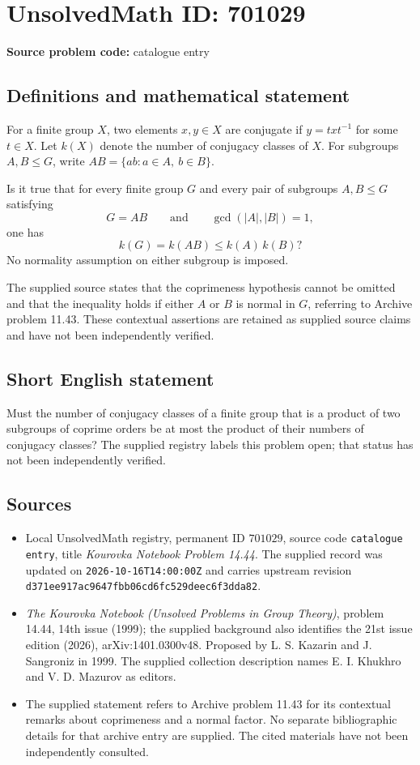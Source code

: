 \documentclass[11pt]{article}
\begin{document}
\section*{UnsolvedMath ID: 701029}
\textbf{Source problem code:} catalogue entry
\subsection{Definitions and mathematical statement}
For a finite group \(X\), two elements \(x,y\in X\) are conjugate if \(y=txt^{-1}\) for some \(t\in X\). Let \(k(X)\) denote the number of conjugacy classes of \(X\). For subgroups \(A,B\leq G\), write \(AB=\{ab:a\in A,\ b\in B\}\).

Is it true that for every finite group \(G\) and every pair of subgroups \(A,B\leq G\) satisfying
\[
G=AB\qquad\text{and}\qquad \gcd(|A|,|B|)=1,
\]
one has
\[
k(G)=k(AB)\leq k(A)\,k(B)?
\]
No normality assumption on either subgroup is imposed.

The supplied source states that the coprimeness hypothesis cannot be omitted and that the inequality holds if either \(A\) or \(B\) is normal in \(G\), referring to Archive problem 11.43. These contextual assertions are retained as supplied source claims and have not been independently verified.
\subsection{Short English statement}
Must the number of conjugacy classes of a finite group that is a product of two subgroups of coprime orders be at most the product of their numbers of conjugacy classes? The supplied registry labels this problem open; that status has not been independently verified.
\subsection{Sources}
\begin{itemize}
\item Local UnsolvedMath registry, permanent ID \(701029\), source code \texttt{catalogue entry}, title \emph{Kourovka Notebook Problem 14.44}. The supplied record was updated on \texttt{2026-10-16T14:00:00Z} and carries upstream revision \texttt{d371ee917ac9647fbb06cd6fc529deec6f3dda82}.
\item \emph{The Kourovka Notebook (Unsolved Problems in Group Theory)}, problem 14.44, 14th issue (1999); the supplied background also identifies the 21st issue edition (2026), arXiv:1401.0300v48. Proposed by L. S. Kazarin and J. Sangroniz in 1999. The supplied collection description names E. I. Khukhro and V. D. Mazurov as editors.
\item The supplied statement refers to Archive problem 11.43 for its contextual remarks about coprimeness and a normal factor. No separate bibliographic details for that archive entry are supplied. The cited materials have not been independently consulted.
\end{itemize}
\end{document}
